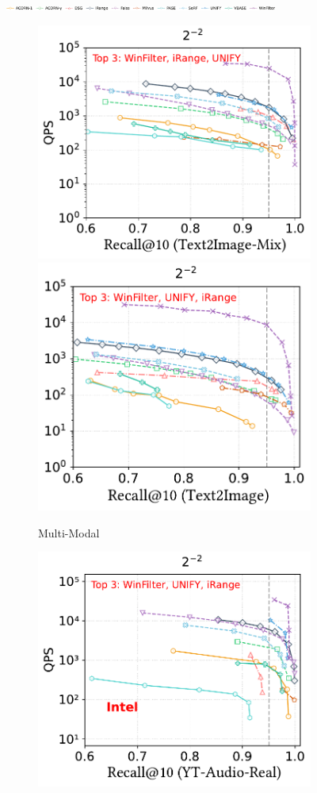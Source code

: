 \documentclass[sigconf, nonacm]{acmart}
\begin{document}
{\begin{figure}[t]
	\centering
	
	\includegraphics[width=0.8\textwidth]{figures/exp/range_legend.pdf}
	
	
	\begin{subfigure}[b]{0.39\textwidth}
		\centering
		\includegraphics[width=0.495\linewidth]{figures/exp/range_multimodel.pdf}
		\hfill 
		\includegraphics[width=0.47\linewidth]{figures/exp/range_multimodel_1.pdf}
		\caption{Multi-Modal}
		\label{fig:range-multimodal} 
	\end{subfigure}
	\hfill %
	\begin{subfigure}[b]{0.39\textwidth}
		\centering
		\includegraphics[width=0.495\linewidth]{figures/exp/range_85.pdf}

\end{subfigure}
\end{figure}}
\end{document}

